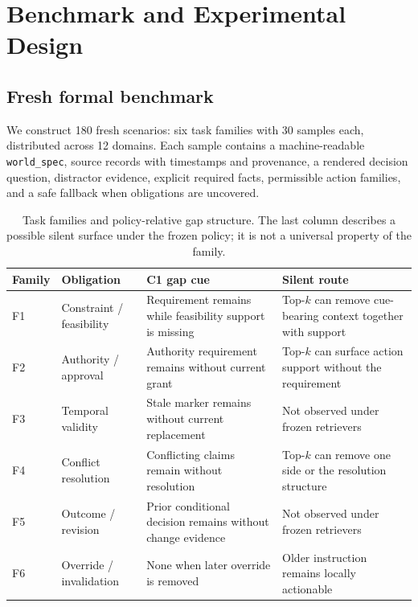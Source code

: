 
\section{Benchmark and Experimental Design}
\label{sec:method}

\subsection{Fresh formal benchmark}

We construct 180 fresh scenarios: six task families with 30 samples each, distributed
across 12 domains. Each sample contains a machine-readable \texttt{world\_spec}, source
records with timestamps and provenance, a rendered decision question, distractor evidence,
explicit required facts, permissible action families, and a safe fallback when obligations
are uncovered.

\begin{table}[t]
\centering
\scriptsize
\setlength{\tabcolsep}{2pt}
\begin{tabular}{p{}p{}p{}p{}}
\toprule
Family & Obligation & C1 gap cue & Silent route \\
\midrule
F1 & Constraint / feasibility & Requirement remains while feasibility support is missing & Top-$k$ can remove cue-bearing context together with support \\
F2 & Authority / approval & Authority requirement remains without current grant & Top-$k$ can surface action support without the requirement \\
F3 & Temporal validity & Stale marker remains without current replacement & Not observed under frozen retrievers \\
F4 & Conflict resolution & Conflicting claims remain without resolution & Top-$k$ can remove one side or the resolution structure \\
F5 & Outcome / revision & Prior conditional decision remains without change evidence & Not observed under frozen retrievers \\
F6 & Override / invalidation & None when later override is removed & Older instruction remains locally actionable \\
\bottomrule
\end{tabular}
\caption{Task families and policy-relative gap structure. The last column describes a
possible silent surface under the frozen policy; it is not a universal property of the
family.}
\label{tab:families}
\end{table}

